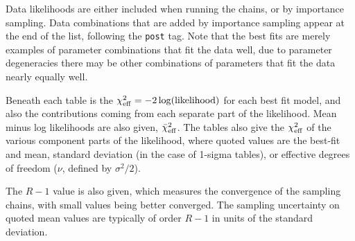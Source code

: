 Data likelihoods are either included when running the chains, or by importance sampling. Data combinations that are added by importance sampling appear
at the end of the list, following the {\tt post{\textunderscore}} tag. Note that the best fits are merely examples of parameter combinations that fit the data well, due to parameter degeneracies there may be other combinations of parameters that fit the data nearly equally well.

Beneath each table is the $\chi^2_{\rm eff}=-2\log({\rm likelihood})$ for each best fit model, and also the contributions coming from each separate part of the likelihood. Mean minus log likelihoods are also given, $\bar{\chi}^2_{\rm eff}$.
The tables also give the $\chi^2_{\rm eff}$ of the various component parts of the likelihood, where quoted values are the best-fit and mean, standard deviation (in the case of 1-sigma tables), or effective degrees of freedom ($\nu$, defined by $\sigma^2/2$).

The $R-1$ value is also given, which measures the convergence of the sampling chains, with small values being better converged. The sampling uncertainty on quoted mean values are typically of order $R-1$ in units of the standard deviation.


\newpage
